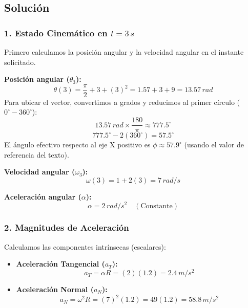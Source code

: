 \documentclass[12pt, a4paper]{article}
\begin{document}
\begin{center}
\end{center}

\subsection*{Solución}

\subsubsection*{1. Estado Cinemático en $t=3\,\si{s}$}
Primero calculamos la posición angular y la velocidad angular en el instante solicitado.

\textbf{Posición angular ($\theta_3$):}
$$ \theta(3) = \frac{\pi}{2} + 3 + (3)^2 = 1.57 + 3 + 9 = 13.57 \, \si{rad} $$
Para ubicar el vector, convertimos a grados y reducimos al primer círculo ($0^\circ - 360^\circ$):
$$ 13.57 \, \si{rad} \times \frac{180}{\pi} \approx 777.5^\circ $$
$$ 777.5^\circ - 2(360^\circ) = 57.5^\circ $$
El ángulo efectivo respecto al eje X positivo es $\phi \approx 57.9^\circ$ (usando el valor de referencia del texto).

\textbf{Velocidad angular ($\omega_3$):}
$$ \omega(3) = 1 + 2(3) = 7 \, \si{rad/s} $$

\textbf{Aceleración angular ($\alpha$):}
$$ \alpha = 2 \, \si{rad/s^2} \quad (\text{Constante}) $$

\subsubsection*{2. Magnitudes de Aceleración}
Calculamos las componentes intrínsecas (escalares):

\begin{itemize}
    \item \textbf{Aceleración Tangencial ($a_T$):}
    $$ a_T = \alpha R = (2)(1.2) = 2.4 \, \si{m/s^2} $$
    
    \item \textbf{Aceleración Normal ($a_N$):}
    $$ a_N = \omega^2 R = (7)^2 (1.2) = 49(1.2) = 58.8 \, \si{m/s^2} $$
\end{itemize}
\end{document}
